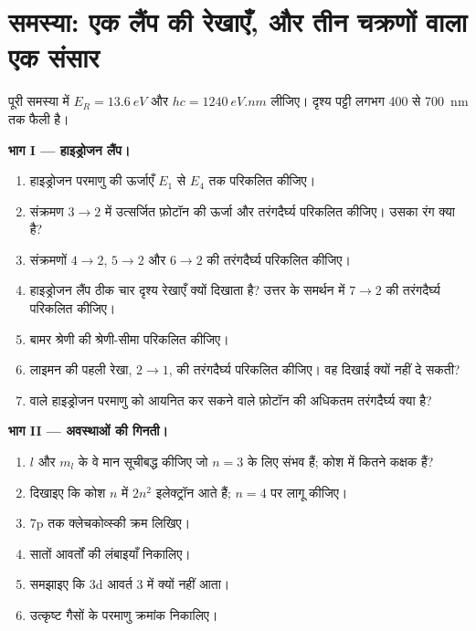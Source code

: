 \section{समस्या: एक लैंप की रेखाएँ, और तीन चक्रणों वाला एक संसार}

\begin{problem}
\label{pb:b1:quantum-numbers:1}
पूरी समस्या में $E_R = \qty{13.6}{eV}$ और $hc = \qty{1240}{eV.nm}$ लीजिए।
दृश्य पट्टी लगभग 400 से \qty{700}{nm} तक फैली है।

\medskip
\noindent\textbf{भाग I --- हाइड्रोजन लैंप।}
\begin{enumerate}
  \item हाइड्रोजन परमाणु की ऊर्जाएँ $E_1$ से $E_4$ तक परिकलित कीजिए।
  \item संक्रमण $3 \to 2$ में उत्सर्जित फ़ोटॉन की ऊर्जा और तरंगदैर्घ्य
        परिकलित कीजिए। उसका रंग क्या है?
  \item संक्रमणों $4 \to 2$, $5 \to 2$
        और $6 \to 2$ की तरंगदैर्घ्य परिकलित कीजिए।
  \item हाइड्रोजन लैंप ठीक चार दृश्य रेखाएँ क्यों दिखाता है?
        उत्तर के समर्थन में $7 \to 2$ की तरंगदैर्घ्य परिकलित कीजिए।
  \item बामर श्रेणी की श्रेणी-सीमा परिकलित कीजिए।
  \item लाइमन की पहली रेखा, $2 \to 1$, की तरंगदैर्घ्य परिकलित कीजिए। वह
        दिखाई क्यों नहीं दे सकती?
  \item {} वाले हाइड्रोजन परमाणु को आयनित कर सकने वाले फ़ोटॉन की
        अधिकतम तरंगदैर्घ्य क्या है?
\end{enumerate}

\medskip
\noindent\textbf{भाग II --- अवस्थाओं की गिनती।}
\begin{enumerate}[resume]
  \item $l$ और $m_l$ के वे मान सूचीबद्ध कीजिए जो $n = 3$ के लिए संभव हैं;
        कोश में कितने कक्षक हैं?
  \item दिखाइए कि कोश $n$ में $2n^2$ इलेक्ट्रॉन आते हैं; $n = 4$ पर लागू कीजिए।
  \item 7p तक क्लेचकोव्स्की क्रम लिखिए।
  \item सातों आवर्तों की लंबाइयाँ निकालिए।
  \item समझाइए कि 3d  आवर्त 3 में क्यों नहीं आता।
  \item उत्कृष्ट गैसों के परमाणु क्रमांक निकालिए।
\end{enumerate}


\end{problem}
